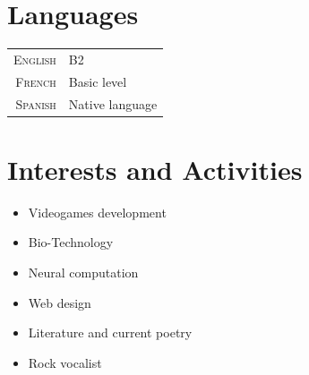 \documentclass[a4paper,10pt]{article} %
\begin{document}

\section{Languages}

\begin{tabular}{r|p{11cm}}
\textsc{English} & B2\\
\textsc{French} & Basic level\\
\textsc{Spanish} & Native language\\
\end{tabular}


\section{Interests and Activities}

\begin{itemize}
  \item Videogames development
  \item Bio-Technology
  \item Neural computation
  \item Web design
  \item Literature and current poetry
  \item Rock vocalist
\end{itemize}
\end{document}
